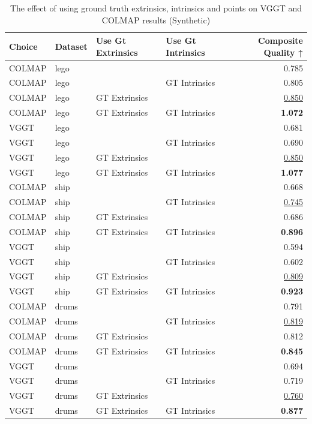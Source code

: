 \begin{table}[H]
\caption{\ifdefined\customcaption \customcaption \else The effect of using ground truth extrinsics, intrinsics and points on VGGT and COLMAP results (Synthetic) \fi}
\label{tab:06_gt_cams_synthetic}
\centering
\scriptsize
\begin{tabular}{llllr}
\toprule
Choice & Dataset & Use Gt Extrinsics & Use Gt Intrinsics & Composite Quality ↑ \\
\midrule
COLMAP & lego &  &  & 0.785 \\
COLMAP & lego &  & GT Intrinsics & 0.805 \\
COLMAP & lego & GT Extrinsics &  & \underline{0.850} \\
COLMAP & lego & GT Extrinsics & GT Intrinsics & \textbf{1.072} \\
\midrule
VGGT & lego &  &  & 0.681 \\
VGGT & lego &  & GT Intrinsics & 0.690 \\
VGGT & lego & GT Extrinsics &  & \underline{0.850} \\
VGGT & lego & GT Extrinsics & GT Intrinsics & \textbf{1.077} \\
\midrule
COLMAP & ship &  &  & 0.668 \\
COLMAP & ship &  & GT Intrinsics & \underline{0.745} \\
COLMAP & ship & GT Extrinsics &  & 0.686 \\
COLMAP & ship & GT Extrinsics & GT Intrinsics & \textbf{0.896} \\
\midrule
VGGT & ship &  &  & 0.594 \\
VGGT & ship &  & GT Intrinsics & 0.602 \\
VGGT & ship & GT Extrinsics &  & \underline{0.809} \\
VGGT & ship & GT Extrinsics & GT Intrinsics & \textbf{0.923} \\
\midrule
COLMAP & drums &  &  & 0.791 \\
COLMAP & drums &  & GT Intrinsics & \underline{0.819} \\
COLMAP & drums & GT Extrinsics &  & 0.812 \\
COLMAP & drums & GT Extrinsics & GT Intrinsics & \textbf{0.845} \\
\midrule
VGGT & drums &  &  & 0.694 \\
VGGT & drums &  & GT Intrinsics & 0.719 \\
VGGT & drums & GT Extrinsics &  & \underline{0.760} \\
VGGT & drums & GT Extrinsics & GT Intrinsics & \textbf{0.877} \\
\bottomrule
\end{tabular}
\end{table}
